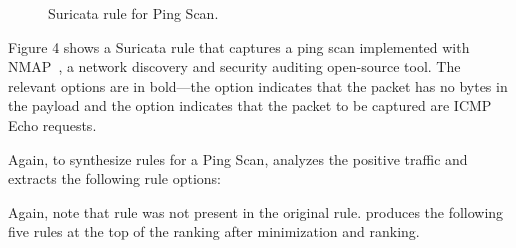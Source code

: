 \documentclass[sigconf,anonymous]{acmart}
\begin{document}
\begin{figure}[h!]
  
  \caption{Suricata rule for Ping Scan.}
  \label{fig:synflood-example}
\end{figure}

Figure 4 shows a Suricata rule that captures a ping scan implemented
with NMAP~\cite{netmap}, a network discovery and security auditing
open-source tool. The relevant options are in bold---the option
 indicates that the packet has no bytes in the
payload and the option  indicates that the packet to
be captured are ICMP Echo requests.

Again, to synthesize rules for a Ping Scan, \tname{} analyzes the
positive traffic and extracts the following rule options:


\begin{figure}[h]
  \vspace{-2ex}
  
  \vspace{-3ex}  
\end{figure}


Again, note that rule  was not present in the original
rule.  \tname{} produces the following five rules at the top of the
ranking after minimization and ranking.


\subsection{}
\label{sec:content-example}



\end{document}
